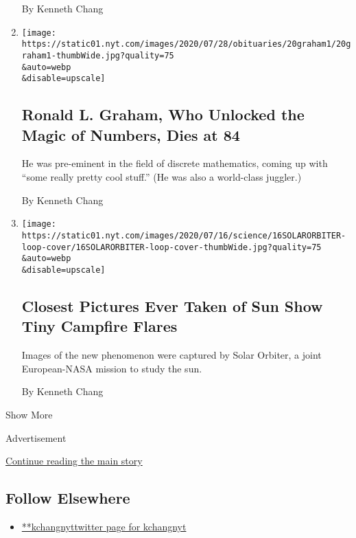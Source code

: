 \begin{enumerate}
  By Kenneth Chang
\item
  \href{/2020/07/23/science/ronald-l-graham-who-unlocked-the-magic-of-numbers-dies-at-84.html}{}

  \texttt{[image: https://static01.nyt.com/images/2020/07/28/obituaries/20graham1/20graham1-thumbWide.jpg?quality=75\\\&auto=webp\\\&disable=upscale]}

  \hypertarget{ronald-l-graham-who-unlocked-the-magic-of-numbers-dies-at-84}{%
  \subsection{Ronald L. Graham, Who Unlocked the Magic of Numbers, Dies
  at
  84}\label{ronald-l-graham-who-unlocked-the-magic-of-numbers-dies-at-84}}

  He was pre-eminent in the field of discrete mathematics, coming up
  with ``some really pretty cool stuff.'' (He was also a world-class
  juggler.)

  By Kenneth Chang
\item
  \href{/2020/07/16/science/solar-orbiter-sun-images.html}{}

  \texttt{[image: https://static01.nyt.com/images/2020/07/16/science/16SOLARORBITER-loop-cover/16SOLARORBITER-loop-cover-thumbWide.jpg?quality=75\\\&auto=webp\\\&disable=upscale]}

  \hypertarget{closest-pictures-ever-taken-of-sun-show-tiny-campfire-flares}{%
  \subsection{Closest Pictures Ever Taken of Sun Show Tiny Campfire
  Flares}\label{closest-pictures-ever-taken-of-sun-show-tiny-campfire-flares}}

  Images of the new phenomenon were captured by Solar Orbiter, a joint
  European-NASA mission to study the sun.

  By Kenneth Chang
\end{enumerate}

Show More

Advertisement

\protect\hyperlink{after-mid2}{Continue reading the main story}

\hypertarget{follow-elsewhere}{%
\subsection{Follow Elsewhere}\label{follow-elsewhere}}

\begin{itemize}
\tightlist
\item
  \href{https://twitter.com/kchangnyt}{**kchangnyttwitter page for
  kchangnyt}
\end{itemize}

